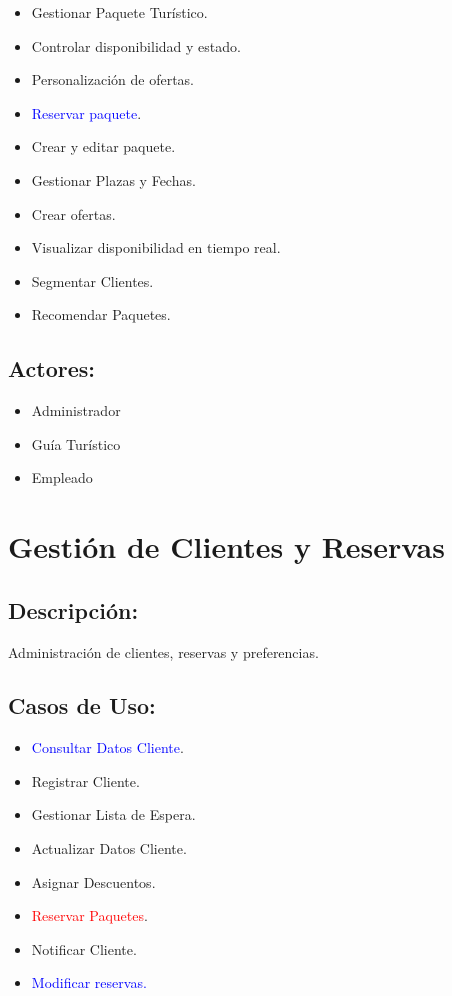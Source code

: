 \begin{itemize}
    \item Gestionar Paquete Turístico.
    \item Controlar disponibilidad y estado.
    \item Personalización de ofertas.
    \item \textcolor{blue}{Reservar paquete}.
    \item Crear y editar paquete.
    \item Gestionar Plazas y Fechas.
    \item Crear ofertas.
    \item Visualizar disponibilidad en tiempo real.
    \item Segmentar Clientes.
    \item Recomendar Paquetes.
\end{itemize}

\subsection*{Actores:}
\begin{itemize}
    \item Administrador
    \item Guía Tur\'istico
    \item Empleado
\end{itemize}

\section{Gesti\'on de Clientes y Reservas}

\subsection*{Descripci\'on:}
Administraci\'on de clientes, reservas y preferencias.

\subsection*{Casos de Uso:}
\begin{itemize}
    \item \textcolor{blue}{Consultar Datos Cliente}.
    \item Registrar Cliente.
    \item Gestionar Lista de Espera.
    \item Actualizar Datos Cliente.
    \item Asignar Descuentos.
    \item \textcolor{red}{Reservar Paquetes}.
    \item Notificar Cliente.
    \item \textcolor{blue}{Modificar reservas.}
\end{itemize}

